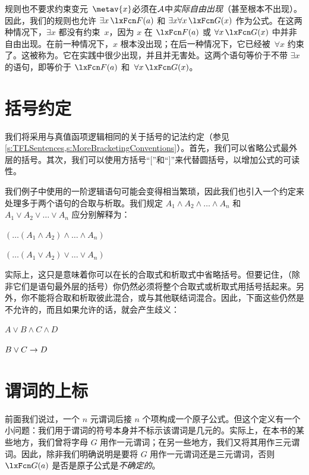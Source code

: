 规则也不要求约束变元~$\metav{x}$必须在$\mathcal{A}$中\emph{实际自由出现}（甚至根本不出现）。因此，我们的规则也允许 $\exists x\,\atom{F}{a}$ 和 $\exists x\forall
x\,\atom{G}{x}$ 作为公式。在这两种情况下，$\exists x$ 都没有约束~$x$，因为 $x$ 在 $\atom{F}{a}$ 或 $\forall x\,\atom{G}{x}$ 中并非自由出现。在前一种情况下，$x$ 根本没出现；在后一种情况下，它已经被~$\forall x$ 约束了。这被称为。它在实践中很少出现，并且并无害处。这两个语句等价于不带 $\exists x$ 的语句，即等价于 $\atom{F}{a}$ 和~$\forall
x\,\atom{G}{x}$。

\section{括号约定}

我们将采用与真值函项逻辑相同的关于括号的记法约定（参见\cref{s:TFLSentences,s:MoreBracketingConventions}）。首先，我们可以省略公式最外层的括号。其次，我们可以使用方括号“[”和“]”来代替圆括号，以增加公式的可读性。

我们例子中使用的一阶逻辑语句可能会变得相当繁琐，因此我们也引入一个约定来处理多于两个语句的合取与析取。我们规定 $A_1 \land A_2 \land \dots \land A_n$ 和 $A_1 \lor A_2 \lor \dots \lor A_n$ 应分别解释为：
\begin{earg}
	\item[] $(\dots(A_1 \land A_2) \land \dots \land A_n)$
	\item[] $(\dots(A_1 \lor A_2) \lor \dots \lor A_n)$
\end{earg}
实际上，这只是意味着你可以在长的合取式和析取式中省略括号。但要记住，（除非它们是语句最外层的括号）你仍然必须将整个合取式或析取式用括号括起来。另外，你不能将合取和析取彼此混合，或与其他联结词混合。因此，下面这些仍然是不允许的，而且如果允许的话，就会产生歧义：
\begin{earg}
	\item[] $A \lor B \land C \land D$
	\item[] $B \lor C \rightarrow D$
\end{earg}

\section{谓词的上标}
前面我们说过，一个 $n$ 元谓词后接 $n$ 个项构成一个原子公式。但这个定义有一个小问题：我们用于谓词的符号本身并不标示该谓词是几元的。实际上，在本书的某些地方，我们曾将字母 $G$ 用作一元谓词；在另一些地方，我们又将其用作三元谓词。因此，除非我们明确说明是要将 $G$ 用作一元谓词还是三元谓词，否则 $\atom{G}{a}$ 是否是原子公式是\emph{不确定的}。

